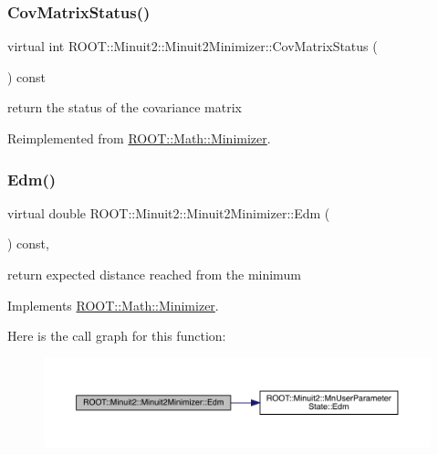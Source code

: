 \subsubsection{\texorpdfstring{CovMatrixStatus()}{CovMatrixStatus()}\hspace{0.1cm}{\footnotesize\ttfamily [3/3]}}
{\footnotesize\ttfamily virtual int R\+O\+O\+T\+::\+Minuit2\+::\+Minuit2\+Minimizer\+::\+Cov\+Matrix\+Status (\begin{DoxyParamCaption}{ }\end{DoxyParamCaption}) const\hspace{0.3cm}{\ttfamily [virtual]}}

return the status of the covariance matrix 

Reimplemented from \mbox{\hyperlink{classROOT_1_1Math_1_1Minimizer_a5f5eab490760ff361d9c44369e9d754d}{R\+O\+O\+T\+::\+Math\+::\+Minimizer}}.

\mbox{\label{classROOT_1_1Minuit2_1_1Minuit2Minimizer_ab9c1bfaaaf4c12acd1fd96ece3509269}} 
\subsubsection{\texorpdfstring{Edm()}{Edm()}\hspace{0.1cm}{\footnotesize\ttfamily [1/3]}}
{\footnotesize\ttfamily virtual double R\+O\+O\+T\+::\+Minuit2\+::\+Minuit2\+Minimizer\+::\+Edm (\begin{DoxyParamCaption}{ }\end{DoxyParamCaption}) const\hspace{0.3cm}{\ttfamily [inline]}, {\ttfamily [virtual]}}



return expected distance reached from the minimum 



Implements \mbox{\hyperlink{classROOT_1_1Math_1_1Minimizer_a990c6935849a3fb31aedab1df6c26f28}{R\+O\+O\+T\+::\+Math\+::\+Minimizer}}.

Here is the call graph for this function\+:
\nopagebreak
\begin{figure}[H]
\begin{center}
\leavevmode
\includegraphics[width=350pt]{d0/d9c/classROOT_1_1Minuit2_1_1Minuit2Minimizer_ab9c1bfaaaf4c12acd1fd96ece3509269_cgraph}
\end{center}
\end{figure}
\mbox{\label{classROOT_1_1Minuit2_1_1Minuit2Minimizer_ab9c1bfaaaf4c12acd1fd96ece3509269}} 
